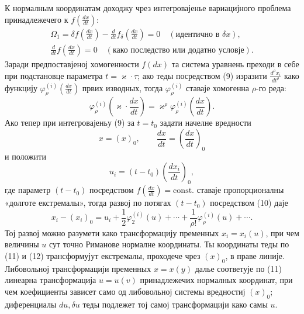 ﻿\documentclass[11pt]{article}
\begin{document}
К нормалным координатам доходжу чрез интегровајенье вариацијного проблема принадлежечего к \(f\!\left(\frac{dx}{dt}\right)\):
\begin{equation}
\begin{gathered}
\Omega_1=\delta f\!\left(\frac{dx}{dt}\right)
-\frac{d}{dt}f_\delta\!\left(\frac{dx}{dt}\right)=0
\quad(\text{идентично в }\delta x),\\
\frac{d}{dt}f\!\left(\frac{dx}{dt}\right)=0
\quad(\text{како последство или додатно условје}).
\end{gathered}
\tag{9}
\end{equation}
Заради предпоставјеној хомогенности \(f(dx)\) та система уравнень преходи в себе при подстановце параметра \(t=\varkappa\cdot\tau\); ако теды посредством (9) изразити \(\frac{d^\rho x_i}{dt^\rho}\) како функцију \(\varphi_\rho^{(i)}\!\left(\frac{dx}{dt}\right)\) првих изводных, тогда \(\varphi_\rho^{(i)}\) ставаје хомогенна \(\rho\)-го реда:
\begin{equation}
\varphi_\rho^{(i)}\!\left(\varkappa\cdot\frac{dx}{dt}\right)
=\varkappa^\rho\varphi_\rho^{(i)}\!\left(\frac{dx}{dt}\right).
\tag{10}
\end{equation}
Ако тепер при интегровајеньу (9) за \(t=t_0\) задати начелне вредности
\[
x=(x)_0,\qquad \frac{dx}{dt}=\left(\frac{dx}{dt}\right)_0
\]
и положити
\begin{equation}
u_i=(t-t_0)\left(\frac{dx_i}{dt}\right)_0,
\tag{11}
\end{equation}
где параметр \((t-t_0)\) посредством \(f\!\left(\frac{dx}{dt}\right)=\mathrm{const.}\) ставаје пропорционалны «долготе екстремалы», тогда развој по потягах \((t-t_0)\) посредством (10) даје
\begin{equation}
x_i-(x_i)_0=u_i+\frac12\varphi_2^{(i)}(u)+\cdots+
\frac{1}{\rho!}\varphi_\rho^{(i)}(u)+\cdots .
\tag{12}
\end{equation}
Тој развој можно разумети како трансформацију пременных \(x_i=x_i(u)\), при чем величины \(u\) сут точно Риманове нормалне координаты. Ты координаты теды по (11) и (12) трансформујут екстремалы, проходече чрез \((x)_0\), в праве линије. Либовольној трансформацији пременных \(x=x(y)\) далье соответује по (11) линеарна трансформација \(u=u(v)\) принадлежечих нормалных координат, при чем коефициенты зависет само од либовольној системы вредностиј \((x)_0\); диференциалы \(du,\delta u\) теды подлежет тој самој трансформацији како самы \(u\).
\end{document}
